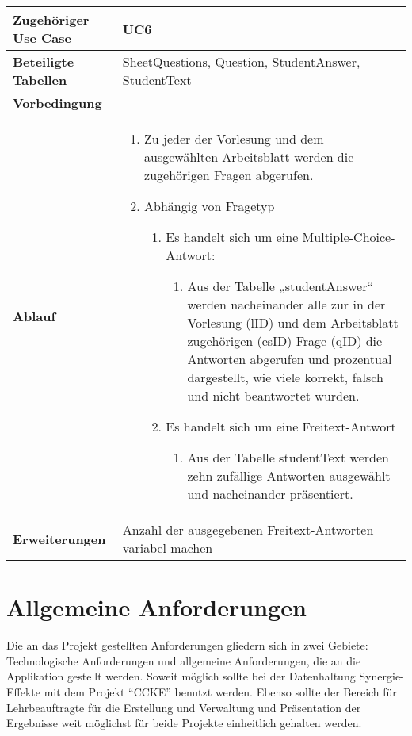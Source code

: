 \begin{table}
	\begin{tabular}{|p{3cm}|p{11.06cm}|}
	\hline
		\textbf{Zugehöriger Use Case}                 &     UC6    \\ \hline
		\textbf{Beteiligte Tabellen}      &    SheetQuestions, Question, StudentAnswer, StudentText     \\ \hline
		\textbf{Vorbedingung}              &         \\ \hline
		\textbf{Ablauf}              &   
			\begin{enumerate}
			  \item Zu jeder der Vorlesung und dem ausgewählten Arbeitsblatt werden die zugehörigen Fragen abgerufen.
			  \item Abhängig von Fragetyp
			  \begin{enumerate}
			    \item Es handelt sich um eine Multiple-Choice-Antwort:
				    \begin{enumerate}
					    \item Aus der Tabelle „studentAnswer“ werden nacheinander alle zur in der Vorlesung (lID) und dem Arbeitsblatt zugehörigen (esID) Frage (qID) die Antworten abgerufen und prozentual dargestellt, wie viele korrekt, falsch und nicht beantwortet wurden.
				 	\end{enumerate}
			    \item Es handelt sich um eine Freitext-Antwort
				    \begin{enumerate}
					   	\item Aus der Tabelle studentText werden zehn zufällige Antworten ausgewählt und nacheinander präsentiert.
				  	\end{enumerate}
			  \end{enumerate}
			\end{enumerate}
		\\ \hline
		\textbf{Erweiterungen}              &    Anzahl der ausgegebenen Freitext-Antworten variabel machen     \\ \hline
	\end{tabular}
\end{table}\FloatBarrier

\section{Allgemeine Anforderungen}
Die an das Projekt gestellten Anforderungen gliedern sich in zwei Gebiete:
Technologische Anforderungen und allgemeine Anforderungen, die an die
Applikation gestellt werden. Soweit möglich sollte bei der Datenhaltung
Synergie-Effekte mit dem Projekt "`CCKE"' benutzt werden. Ebenso sollte der
Bereich für Lehrbeauftragte für die Erstellung und Verwaltung und Präsentation
der Ergebnisse weit möglichst für beide Projekte einheitlich gehalten werden.

